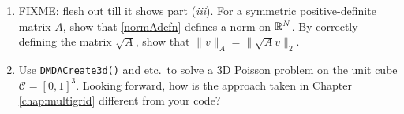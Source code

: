 \begin{enumerate}
\item FIXME: flesh out till it shows part (\emph{iii}).  For a symmetric positive-definite matrix $A$, show that \eqref{normAdefn} defines a norm on $\mathbb{R}^N$.  By correctly-defining the matrix $\sqrt{A}$, show that $\|v\|_A = \|\sqrt{A}v\|_2$.
\item Use \texttt{DMDACreate3d()} and etc.~to solve a 3D Poisson problem on the unit cube $\mathcal{C}=[0,1]^3$.  Looking forward, how is the approach taken in Chapter \ref{chap:multigrid} different from your code?
\end{enumerate}
